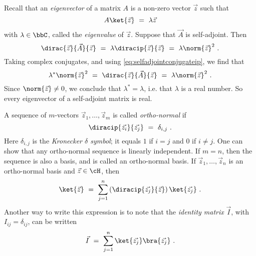 \documentclass[12pt]{amsart}
\numberwithin{equation}{section}
\numberwithin{figure}{section}
\theoremstyle{theorem}
\begin{document}
	Recall that an \emph{eigenvector} of a matrix $A$ is a non-zero vector 
	$\vec{z}$ such that
	$$ A \ket{\vec{z}} \ = \ \lambda \vec{z}$$
	with $\lambda \in \bbC$, called the \emph{eigenvalue} of $\vec{z}$.  
	Suppose that $\vec{A}$ is self-adjoint.  Then
	$$\dirac{\vec{z}}{\vec{A}}{\vec{z}} \ = \ \lambda 
	\diracip{\vec{z}}{\vec{z}} \ = 
	\ \lambda \norm{\vec{z}}^2 \ . $$
	Taking complex conjugates, and using \eqref{eq:selfadjointconjugateip}, we 
	find that
	$$ \lambda^* \norm{\vec{z}}^2 \ = \ \dirac{\vec{z}}{\vec{A}}{\vec{z}} \ = \ 
	\lambda \norm{\vec{z}}^2 \ . $$
	Since $\norm{\vec{z}}\neq 0$, we conclude that $\lambda^*=\lambda$, i.e. 
	that $\lambda$ is a real number.  So every eigenvector of a self-adjoint 
	matrix is real.
	
	A sequence of $m$-vectors $\vec{z}_1,\ldots,\vec{z}_m$ is called 
	\emph{ortho-normal} if 
	$$\diracip{\vec{z_i}}{\vec{z_j}} \ = \ \delta_{i,j} \ . $$ 
	Here $\delta_{i,j}$ is the \emph{Kronecker $\delta$ symbol}; it equals $1$ 
	if $i=j$ and $0$ if $i\neq j$.  One can show that any ortho-normal sequence 
	is linearly independent.  If $m=n$, then the sequence is also a basis, and 
	is called an ortho-normal basis.  If $\vec{z}_1,\ldots,\vec{z}_n$ is an 
	ortho-normal basis and $\vec{z}\in \cH$, then
	$$\ket{\vec{z}} \ = \ \sum_{j=1}^n \left ( \diracip{\vec{z_j}}{\vec{z}} 
	\right ) \ket{\vec{z_j}} \ .  $$
	Another way to write this expression is to note that the \emph{identity 
	matrix} $\vec{I}$, with $I_{ij}=\delta_{ij}$, can be written
	$$ \vec{I} \ = \ \sum_{j=1}^n \ket{\vec{z_j}}\bra{\vec{z_j}} \ . $$
	
\end{document}
